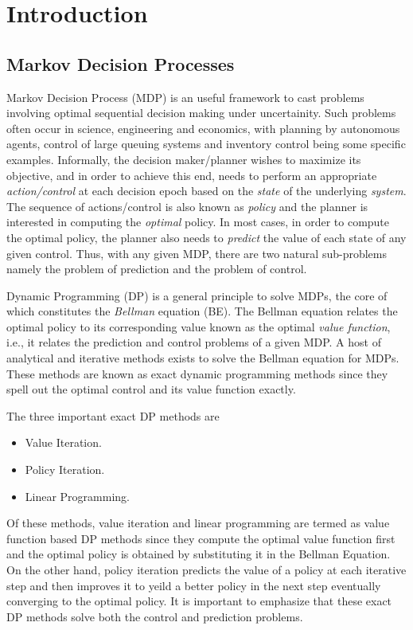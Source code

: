 \chapter{Introduction}
\section{Markov Decision Processes}
Markov Decision Process (MDP) is an useful framework to cast problems involving optimal sequential decision making under uncertainity. Such problems often occur in science, engineering and economics, with planning by autonomous agents, control of large queuing systems and inventory control being some specific examples. Informally, the decision maker/planner wishes to maximize its objective, and in order to achieve this end, needs to perform an appropriate \emph{action/control} at each decision epoch based on the \emph{state} of the underlying \emph{system}. 
The sequence of actions/control is also known as \emph{policy} and the planner is interested in computing the \emph{optimal} policy. In most cases, in order to compute the optimal policy, the planner also needs to \emph{predict} the value of each state of any given control. Thus, with any given MDP, there are two natural sub-problems namely the problem of prediction and the problem of control.\par
Dynamic Programming (DP) is a general principle to solve MDPs, the core of which constitutes the \emph{Bellman} equation (BE). The Bellman equation relates the optimal policy to its corresponding value known as the optimal \emph{value function}, i.e., it relates the prediction and control problems of a given MDP. A host of analytical and iterative methods exists to solve the Bellman equation for MDPs. These methods are known as exact dynamic programming methods since they spell out the optimal control and its value function exactly.\par
The three important exact DP methods are 
\begin{itemize}
\item Value Iteration.
\item Policy Iteration.
\item Linear Programming.
\end{itemize}
Of these methods, value iteration and linear programming are termed as value function based DP methods since they compute the optimal value function first and the optimal policy is obtained by substituting it in the Bellman Equation. On the other hand, policy iteration predicts the value of a policy at each iterative step and then improves it to yeild a better policy in the next step eventually converging to the optimal policy. It is important to emphasize that these exact DP methods solve both the control and prediction problems.\par
